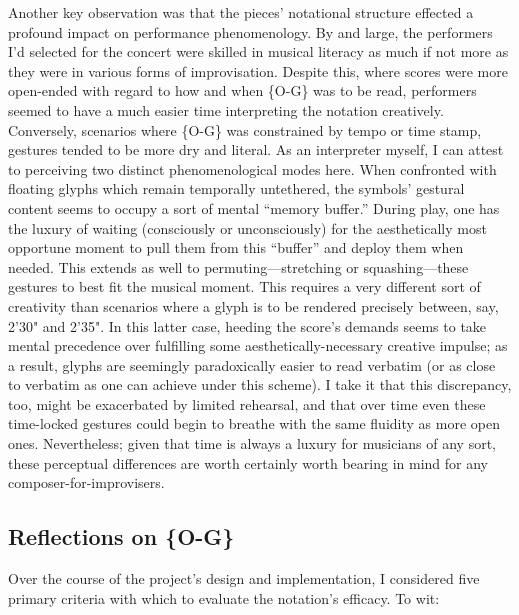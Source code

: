     Another key observation was that the pieces' notational structure effected a profound impact on performance phenomenology. By and large, the performers I'd selected for the concert were skilled in musical literacy as much if not more as they were in various forms of improvisation. Despite this, where scores were more open-ended with regard to how and when \{O-G\} was to be read, performers seemed to have a much easier time interpreting the notation creatively. Conversely, scenarios where \{O-G\} was constrained by tempo or time stamp, gestures tended to be more dry and literal. As an interpreter myself, I can attest to perceiving two distinct phenomenological modes here. When confronted with floating glyphs which remain temporally untethered, the symbols' gestural content seems to occupy a sort of mental ``memory buffer.'' During play, one has the luxury of waiting (consciously or unconsciously) for the aesthetically most opportune moment to pull them from this ``buffer'' and deploy them when needed. This extends as well to permuting---stretching or squashing---these gestures to best fit the musical moment. This requires a very different sort of creativity than scenarios where a glyph is to be rendered precisely between, say, 2'30" and 2'35". In this latter case, heeding the score's demands seems to take mental precedence over fulfilling some aesthetically-necessary creative impulse; as a result, glyphs are seemingly paradoxically easier to read verbatim (or as close to verbatim as one can achieve under this scheme). I take it that this discrepancy, too, might be exacerbated by limited rehearsal, and that over time even these time-locked gestures could begin to breathe with the same fluidity as more open ones. Nevertheless; given that time is always a luxury for musicians of any sort, these perceptual differences are worth certainly worth bearing in mind for any composer-for-improvisers. 

    \subsection{Reflections on \{O-G\}}

    Over the course of the project's design and implementation, I considered five primary criteria with which to evaluate the notation's efficacy. To wit:

